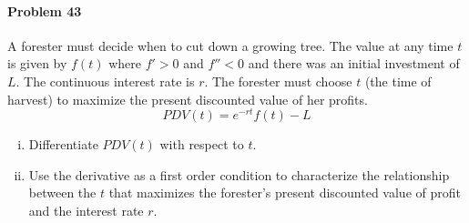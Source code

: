 \documentclass[a4paper, 11pt]{article}
\begin{document}
\paragraph{Problem 43}
A forester must decide when to cut down a growing tree.
The value at any time $t$ is given by $f(t)$ where $f' > 0$ and $f'' < 0$ and there was an initial investment of $L$.
The continuous interest rate is $r$.
The forester must choose $t$ (the time of harvest) to maximize the present discounted value of her profits.
\[
	PDV(t) = e^{-rt}f(t) - L
\]
\begin{enumerate}[(i)]
	\item Differentiate $PDV(t)$ with respect to $t$.
	\item Use the derivative as a first order condition to characterize the relationship between the $t$ that maximizes the forester's present discounted value of profit and the interest rate $r$.
\end{enumerate}
\end{document}
